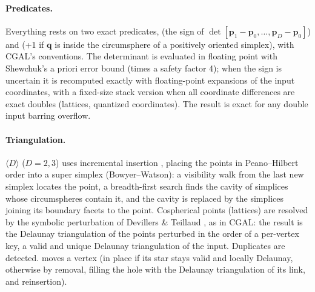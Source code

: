 \paragraph*{Predicates.} Everything rests on two exact predicates,  (the sign of
$\det[\bm p_1-\bm p_0,\dots,\bm p_D-\bm p_0]$) and  (+1 if $\bm q$ is inside the circumsphere of a positively
oriented simplex), with CGAL's conventions. The determinant is evaluated in floating point with Shewchuk's a priori error bound
\cite{Shewchuk1997} (times a safety factor 4); when the sign is uncertain it is recomputed exactly with floating-point expansions
of the input coordinates, with a fixed-size stack version when all coordinate differences are exact doubles (lattices, quantized
coordinates). The result is exact for any double input barring overflow.

\paragraph*{Triangulation.} $\langle D\rangle$ ($D=2,3$) uses incremental insertion \cite{Bowyer1981,Watson1981}, placing the points in Peano--Hilbert order into a super
simplex (Bowyer--Watson): a visibility walk from the last new simplex locates the point, a breadth-first search finds the cavity of
simplices whose circumspheres contain it, and the cavity is replaced by the simplices joining its boundary facets to the point.
Cospherical points (lattices) are resolved by the symbolic perturbation of Devillers \& Teillaud \cite{DevillersTeillaud2011},
as in CGAL: the result is the Delaunay triangulation of the points perturbed in the order of a per-vertex key, a valid and unique
Delaunay triangulation of the input. Duplicates are detected.  moves a vertex (in place if its star stays valid
and locally Delaunay, otherwise by removal, filling the hole with the Delaunay triangulation of its link, and reinsertion).

